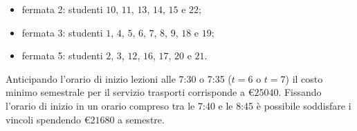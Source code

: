 \begin{itemize}
\item fermata 2: studenti $10$, $11$, $13$, $14$, $15$ e $22$;
\item fermata 3: studenti $1$, $4$, $5$, $6$, $7$, $8$, $9$, $18$ e $19$;
\item fermata 5: studenti $2$, $3$, $12$, $16$, $17$, $20$ e $21$.
\end{itemize}

Anticipando l'orario di inizio lezioni alle 7:30 o 7:35 ($t=6$ o $t=7$) il costo minimo semestrale per il servizio trasporti corrisponde a €$25040$. Fissando l'orario di inizio in un orario compreso tra le 7:40 e le 8:45 è possibile soddisfare i vincoli spendendo €$21680$ a semestre.


